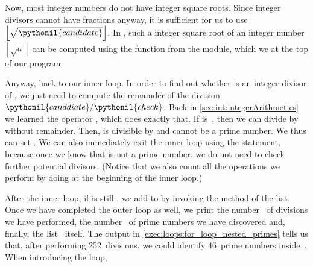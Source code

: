 Now, most integer numbers do not have integer square roots.
Since integer divisors cannot have fractions anyway, it is sufficient for us to use $\left\lfloor\sqrt{\pythonil{candidate}}\right\rfloor$.
In \python, such a  integer square root of an integer number~$\left\lfloor\sqrt{a}\right\rfloor$ can be computed using the  function from the  module, which we  at the top of our program.

Anyway, back to our inner loop.
In order to find out whether  is an integer divisor of , we just need to compute the remainder of the division~$\pythonil{canddiate}/\pythonil{check}$.
Back in \cref{sec:int:integerArithmetics} we learned the  operator \expandafter\pythonilIdx{\%}, which does exactly that.
If  is~, then we can divide  by  without remainder.
Then,  is divisible by  and cannot be a prime number.
We thus can set .
We can also immediately exit the inner loop using the  statement, because once we know that  is not a prime number, we do not need to check further potential divisors.
(Notice that we also count all the  operations we perform by doing  at the beginning of the inner loop.)

After the inner loop, if  is still , we add  to  by invoking the  method of the list.
Once we have completed the outer loop as well, we print the number~ of divisions we have performed, the number~ of prime numbers we have discovered and, finally, the list~ itself.
The output in \cref{exec:loops:for_loop_nested_primes} tells us that, after performing 252~divisions, we could identify 46~prime numbers inside~.%
%
\FloatBarrier%
\endhsection%
%
%
When introducing the  loop, %
%
\endhsection%
%
\endhsection%
%
